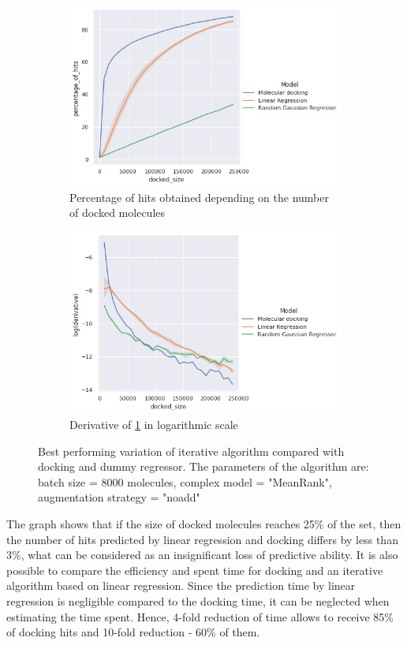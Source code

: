 \begin{figure}[H]
\centering
\begin{subfigure}{0.85\textwidth}
\includegraphics[width=0.9\linewidth]{Images/4eiyPercentageOfHits.jpg} 
\caption{Percentage of hits obtained depending on the number of docked molecules}
\label{best1}
\end{subfigure}
\begin{subfigure}{0.85\textwidth}
\includegraphics[width=0.9\linewidth]{Images/4eiyDerivative.jpg}
\caption{Derivative of \ref{best1} in logarithmic scale}
\end{subfigure}

\caption{Best performing variation of iterative algorithm compared with docking and dummy regressor. The parameters of the algorithm are: batch size = 8000 molecules, complex model = "MeanRank", augmentation strategy = "noadd"}
\label{best}
\end{figure}


The graph shows that if the size of docked molecules reaches 25\% of the set, then the number of hits predicted by linear regression and docking differs by less than 3\%, what can be considered as an insignificant loss of predictive ability.
It is also possible to compare the efficiency and spent time for docking and an iterative algorithm based on linear regression.
Since the prediction time by linear regression is negligible compared to the docking time, it can be neglected when estimating the time spent. 
Hence, 4-fold reduction of time allows to receive 85\% of docking hits and 10-fold reduction - 60\% of them.\\

